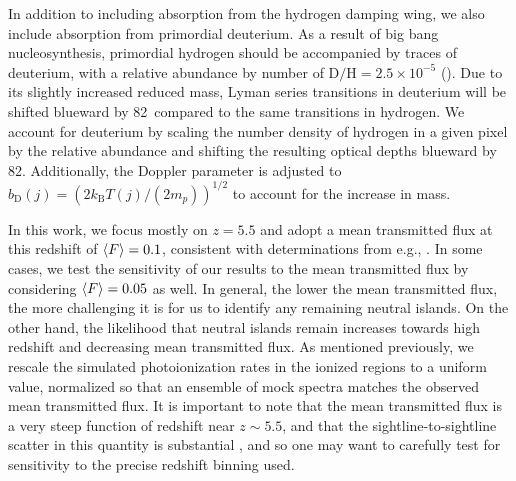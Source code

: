 In addition to including absorption from the hydrogen damping wing, we also include absorption from primordial deuterium. As a result of big bang nucleosynthesis, primordial hydrogen should be accompanied by traces of deuterium, with a relative abundance by number of $\text{D}/\text{H} = 2.5\times 10^{-5}$ (\citealt{Cooke:2013cba}). Due to its slightly increased reduced mass, Lyman series transitions in deuterium will be shifted blueward by 82\kms\ compared to the same transitions in hydrogen. We account for deuterium by scaling the number density of hydrogen in a given pixel by the relative abundance and shifting the resulting optical depths blueward by 82\kms. Additionally, the Doppler parameter is adjusted to $b_{\text{D}}(j) = \left( 2k_{\text{B}}T(j)/(2m_{p}) \right)^{1/2}$ to account for the increase in mass.

In this work, we focus mostly on $z=5.5$ and adopt a mean transmitted flux at this redshift of $\langle F \rangle=0.1$, consistent with determinations from e.g., \citet{Becker:2001ee}. In some cases, we test the
sensitivity of our results to the mean transmitted flux by considering $\langle F \rangle=0.05$ as well. In general, the lower the mean transmitted flux, the more challenging it is for us to identify any remaining
neutral islands. On the other hand, the likelihood that neutral islands remain increases towards high redshift and decreasing mean transmitted flux. As mentioned previously, we rescale the simulated photoionization rates in the ionized regions to a uniform value,
normalized so that an ensemble of mock spectra matches the observed mean transmitted flux. It is important to note that the mean transmitted flux is a very steep function of redshift near $z \sim 5.5$, and that the sightline-to-sightline scatter in this quantity is substantial \citep{Fan:2005es}, and so one may want to carefully test for sensitivity to the precise redshift binning used.


